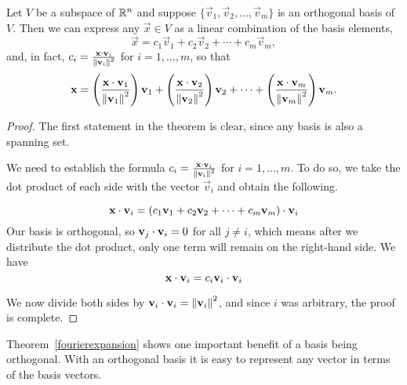 \documentclass{ximera}
\begin{document}
\begin{theorem}\label{fourierexpansion}
Let $V$ be a subspace of $\mathbb{R}^n$ and suppose $\{ \vec{v}_1, \vec{v}_2, \ldots, \vec{v}_m \}$
is an orthogonal basis of $V$.
Then we can express any $\vec{x}\in V$ as a linear combination of the basis elements,
\[ \vec{x} =
c_1 \vec{v}_1 +
c_2 \vec{v}_2 +
\cdots +
c_m \vec{v}_m,
\]
and, in fact, $c_i = \frac{\mathbf{x}\cdot \mathbf{v}_i}{\left\lVert\mathbf{v}_i\right\rVert^2}$ for $i=1,\ldots,m$, so that
\begin{equation}
\mathbf{x} =
\left(\frac{\mathbf{x}\cdot \mathbf{v}_1}{\left\lVert\mathbf{v}_1\right\rVert^2}\right) \mathbf{v}_1 +
\left(\frac{\mathbf{x}\cdot \mathbf{v}_2}{\left\lVert\mathbf{v}_2\right\rVert^2}\right) \mathbf{v}_2 +
\cdots +
\left(\frac{\mathbf{x}\cdot \mathbf{v}_m}{\left\lVert\mathbf{v}_m\right\rVert^2}\right) \mathbf{v}_m.
\end{equation}\label{FourierEqn}
\end{theorem}

\begin{proof}
The first statement in the theorem is clear, since any basis is also a spanning set.  

We need to establish the formula $c_i = \frac{\mathbf{x}\cdot \mathbf{v}_i}{\left\lVert\mathbf{v}_i\right\rVert^2}$ for $i=1,\ldots,m$. To do so, we take the dot product of
each side with the vector $\vec{v}_i$ and obtain the following.

\begin{equation*}
  \mathbf{x} \cdot \mathbf{v}_i =  \left(c_1\mathbf{v}_1 +
c_2\mathbf{v}_2 +
\cdots +
c_m\mathbf{v}_m\right) \cdot \mathbf{v}_i 
\end{equation*}
Our basis is orthogonal, so $\mathbf{v}_j \cdot \mathbf{v}_i = 0$ for all $j \neq i$, which means after we distribute the dot product, only one term will remain on the right-hand side.  We have 
\begin{equation*}
  \mathbf{x} \cdot \mathbf{v}_i =  c_i\mathbf{v}_i \cdot \mathbf{v}_i 
\end{equation*}

We now divide both sides by $\mathbf{v}_i \cdot \mathbf{v}_i = \left\lVert\mathbf{v}_i\right\rVert^2$, and since $i$ was arbitrary, the proof is complete.
\end{proof}

Theorem~\ref{fourierexpansion} shows one important benefit of a basis being orthogonal.  With an orthogonal basis it is easy to represent any vector in terms of the basis vectors.  
\end{document}
